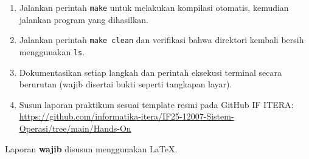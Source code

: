 \begin{enumerate}
    \item Jalankan perintah \texttt{make} untuk melakukan kompilasi otomatis, kemudian jalankan program yang dihasilkan.

    \item Jalankan perintah \texttt{make clean} dan verifikasi bahwa direktori kembali bersih menggunakan \texttt{ls}.

    \item Dokumentasikan setiap langkah dan perintah eksekusi terminal secara berurutan (wajib disertai bukti seperti tangkapan layar).

    \item Susun laporan praktikum sesuai template resmi pada GitHub IF ITERA:
    \url{https://github.com/informatika-itera/IF25-12007-Sistem-Operasi/tree/main/Hands-On}
\end{enumerate}

Laporan \textbf{wajib} disusun menggunakan \LaTeX.